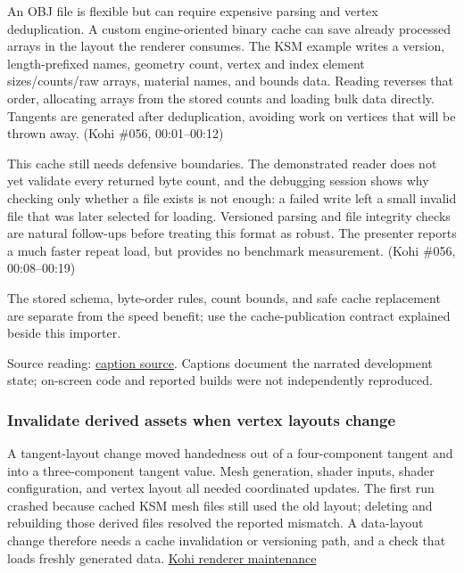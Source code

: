 \hypertarget{06-engine-ii-ch027-runtime-loading-and-an-engine-oriented-mesh-cache}{}

An OBJ file is flexible but can require expensive parsing and vertex deduplication. A custom engine-oriented binary cache can save already processed arrays in the layout the renderer consumes. The KSM example writes a version, length-prefixed names, geometry count, vertex and index element sizes/counts/raw arrays, material names, and bounds data. Reading reverses that order, allocating arrays from the stored counts and loading bulk data directly. Tangents are generated after deduplication, avoiding work on vertices that will be thrown away. (Kohi \#056, 00:01--00:12)

This cache still needs defensive boundaries. The demonstrated reader does not yet validate every returned byte count, and the debugging session shows why checking only whether a file exists is not enough: a failed write left a small invalid file that was later selected for loading. Versioned parsing and file integrity checks are natural follow-ups before treating this format as robust. The presenter reports a much faster repeat load, but provides no benchmark measurement. (Kohi \#056, 00:08--00:19)

The stored schema, byte-order rules, count bounds, and safe cache replacement are separate from the speed benefit; use the cache-publication contract explained beside this importer.

Source reading: \href{https://www.youtube.com/watch?v=Uk2p3vKBMXE}{caption source}. Captions document the narrated development state; on-screen code and reported builds were not independently reproduced.

\subsubsection{Invalidate derived assets when vertex layouts change}\label{06-engine-ii-ch027-invalidate-derived-assets-when-vertex-layouts-change}

\hypertarget{06-engine-ii-ch027-invalidate-derived-assets-when-vertex-layouts-change}{}

A tangent-layout change moved handedness out of a four-component tangent and into a three-component tangent value. Mesh generation, shader inputs, shader configuration, and vertex layout all needed coordinated updates. The first run crashed because cached KSM mesh files still used the old layout; deleting and rebuilding those derived files resolved the reported mismatch. A data-layout change therefore needs a cache invalidation or versioning path, and a check that loads freshly generated data. \href{https://www.youtube.com/watch?v=x8ao57nbMlY}{Kohi renderer maintenance}

